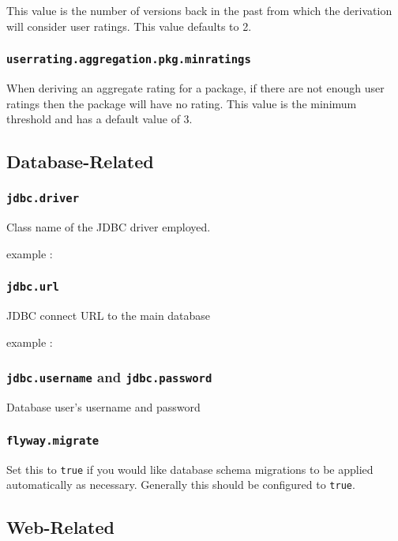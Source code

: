 This value is the number of versions back in the past from which the derivation will consider user ratings.  This value defaults to 2.

\subsubsection{\tt userrating.aggregation.pkg.minratings}

When deriving an aggregate rating for a package, if there are not enough user ratings then the package will have no rating.  This value is the minimum threshold and has a default value of 3.

\subsection{Database-Related}

\subsubsection{\tt jdbc.driver}

Class name of the JDBC driver employed.

example : 

\subsubsection{\tt jdbc.url}

JDBC connect URL to the main database

example : 

\subsubsection{{\tt jdbc.username} and {\tt jdbc.password}}

Database user's username and password

\subsubsection{\tt flyway.migrate}

Set this to {\tt true} if you would like database schema migrations to be applied automatically as necessary.  Generally this should be configured to {\tt true}.

\subsection{Web-Related}

